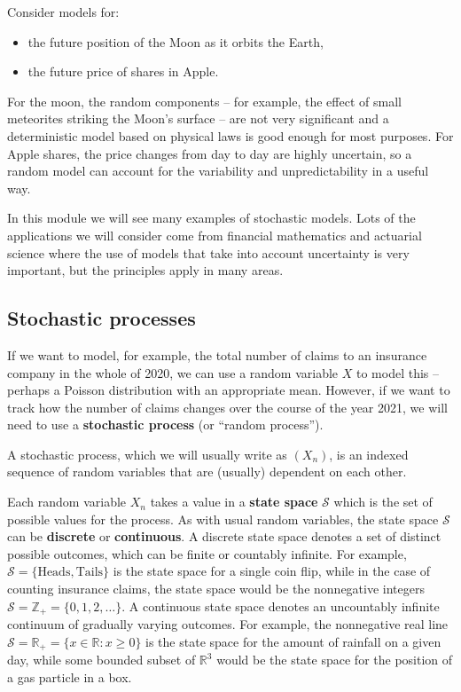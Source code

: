 \documentclass[
  a4paper,
]{article}
\providecommand{\tightlist}{%
  \setlength{\itemsep}{0pt}\setlength{\parskip}{0pt}}
\theoremstyle{definition}
\theoremstyle{definition}
\theoremstyle{definition}
\theoremstyle{remark}
\begin{document}
Consider models for:

\begin{itemize}
\tightlist
\item
  the future position of the Moon as it orbits the Earth,
\item
  the future price of shares in Apple.
\end{itemize}

For the moon, the random components -- for example, the effect of small meteorites striking the Moon's surface -- are not very significant and a deterministic model based on physical laws is good enough for most purposes. For Apple shares, the price changes from day to day are highly uncertain, so a random model can account for the variability and unpredictability in a useful way.

In this module we will see many examples of stochastic models. Lots of the applications we will consider come from financial mathematics and actuarial science where the use of models that take into account uncertainty is very important, but the principles apply in many areas.

\hypertarget{stochastic-processes}{%
\subsection{Stochastic processes}\label{stochastic-processes}}

If we want to model, for example, the total number of claims to an insurance company in the whole of 2020, we can use a random variable \(X\) to model this -- perhaps a Poisson distribution with an appropriate mean. However, if we want to track how the number of claims changes over the course of the year 2021, we will need to use a \textbf{stochastic process} (or ``random process'').

A stochastic process, which we will usually write as \((X_n)\), is an indexed sequence of random variables that are (usually) dependent on each other.

Each random variable \(X_n\) takes a value in a \textbf{state space} \(\mathcal S\) which is the set of possible values for the process. As with usual random variables, the state space \(\mathcal S\) can be \textbf{discrete} or \textbf{continuous}. A discrete state space denotes a set of distinct possible outcomes, which can be finite or countably infinite. For example, \(\mathcal S = \{\text{Heads},\text{Tails}\}\) is the state space for a single coin flip, while in the case of counting insurance claims, the state space would be the nonnegative integers \(\mathcal S = \mathbb Z_+ = \{0,1,2,\dots\}\). A continuous state space denotes an uncountably infinite continuum of gradually varying outcomes. For example, the nonnegative real line \(\mathcal S = \mathbb R_+ = \{x \in \mathbb R : x \geq 0\}\) is the state space for the amount of rainfall on a given day, while some bounded subset of \(\mathbb R^3\) would be the state space for the position of a gas particle in a box.
\end{document}
